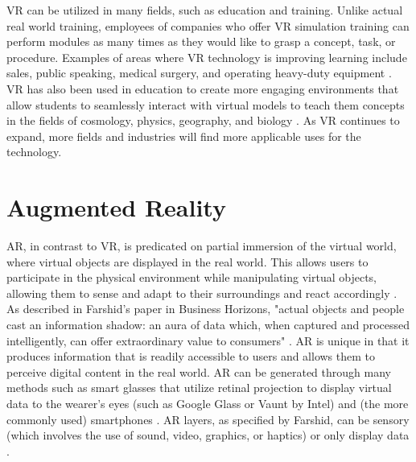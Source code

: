 \documentclass[onecolumn, draftclsnofoot,10pt, compsoc]{IEEEtran}
\begin{document}
    VR can be utilized in many fields, such as education and training. Unlike actual real world training, employees of companies who offer VR simulation training can perform modules as many times as they would like to grasp a concept, task, or procedure. Examples of areas where VR technology is improving learning include sales, public speaking, medical surgery, and operating heavy-duty equipment \cite{2}. VR has also been used in education to create more engaging environments that allow students to seamlessly interact with virtual models to teach them concepts in the fields of cosmology, physics, geography, and biology \cite{2}. As VR continues to expand, more fields and industries will find more applicable uses for the technology.
 
\section{Augmented Reality}
    AR, in contrast to VR, is predicated on partial immersion of the virtual world, where virtual objects are displayed in the real world. This allows users to participate in the physical environment while manipulating virtual objects, allowing them to sense and adapt to their surroundings and react accordingly \cite{1}. As described in Farshid's paper in Business Horizons, "actual objects and people cast an information shadow: an aura of data which, when captured and processed intelligently, can offer extraordinary value to consumers" \cite{2}. AR is unique in that it produces information that is readily accessible to users and allows them to perceive digital content in the real world. AR can be generated through many methods such as smart glasses that utilize retinal projection to display virtual data to the wearer's eyes (such as Google Glass or Vaunt by Intel) and (the more commonly used) smartphones \cite{2}. AR layers, as specified by Farshid, can be sensory (which involves the use of sound, video, graphics, or haptics) or only display data \cite{2}.  
    
\end{document}

